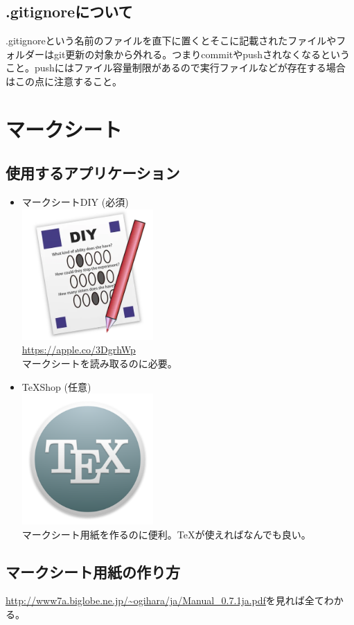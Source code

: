 \documentclass[a4paper]{ltjsreport}
\begin{document}
\subsection{.gitignoreについて}\label{sec:gitignore}
.gitignoreという名前のファイルを直下に置くとそこに記載されたファイルやフォルダーはgit更新の対象から外れる。つまりcommitやpushされなくなるということ。pushにはファイル容量制限があるので実行ファイルなどが存在する場合はこの点に注意すること。
\section{マークシート}
\subsection{使用するアプリケーション}
\begin{itemize}
  \item マークシートDIY {\color{red}(必須)}\\
        \includegraphics[width=5cm]{assets/answersheet-diy.png}\\
        \url{https://apple.co/3DgrhWp}\\
        マークシートを読み取るのに必要。
  \item \TeX Shop (任意)\\
        \includegraphics[width=5cm]{assets/TeX.png}\\
        マークシート用紙を作るのに便利。\TeX が使えればなんでも良い。
\end{itemize}
\subsection{マークシート用紙の作り方}
\url{http://www7a.biglobe.ne.jp/~ogihara/ja/Manual_0.7.1ja.pdf}を見れば全てわかる。
\end{document}
